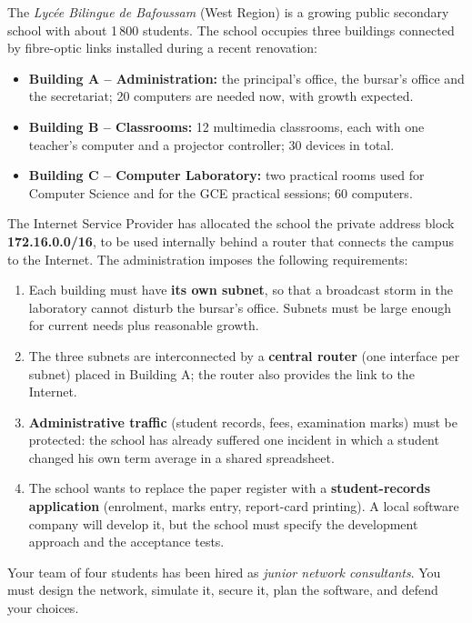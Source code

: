 \documentclass[11pt]{article}
\begin{document}
\begin{experience}
The \emph{Lyc\'ee Bilingue de Bafoussam} (West Region) is a growing public secondary school with about 1\,800 students. The school occupies three buildings connected by fibre-optic links installed during a recent renovation:

\begin{itemize}
\item \textbf{Building A -- Administration:} the principal's office, the bursar's office and the secretariat; 20 computers are needed now, with growth expected.
\item \textbf{Building B -- Classrooms:} 12 multimedia classrooms, each with one teacher's computer and a projector controller; 30 devices in total.
\item \textbf{Building C -- Computer Laboratory:} two practical rooms used for Computer Science and for the GCE practical sessions; 60 computers.
\end{itemize}

The Internet Service Provider has allocated the school the private address block \textbf{172.16.0.0/16}, to be used internally behind a router that connects the campus to the Internet. The administration imposes the following requirements:

\begin{enumerate}
\item Each building must have \textbf{its own subnet}, so that a broadcast storm in the laboratory cannot disturb the bursar's office. Subnets must be large enough for current needs plus reasonable growth.
\item The three subnets are interconnected by a \textbf{central router} (one interface per subnet) placed in Building A; the router also provides the link to the Internet.
\item \textbf{Administrative traffic} (student records, fees, examination marks) must be protected: the school has already suffered one incident in which a student changed his own term average in a shared spreadsheet.
\item The school wants to replace the paper register with a \textbf{student-records application} (enrolment, marks entry, report-card printing). A local software company will develop it, but the school must specify the development approach and the acceptance tests.
\end{enumerate}

Your team of four students has been hired as \emph{junior network consultants}. You must design the network, simulate it, secure it, plan the software, and defend your choices.
\end{experience}
\end{document}
